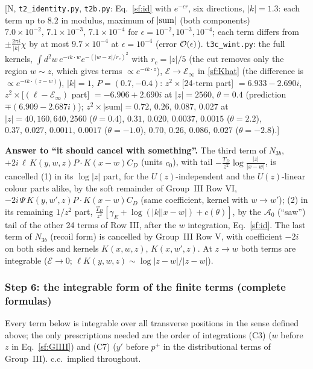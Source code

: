 \documentclass[10pt]{article}
\begin{document}
[N, \texttt{t2\_identity.py}, \texttt{t2b.py}: Eq.~\eqref{sf:id} with $e^{-\epsilon r}$, six directions, $|k|=1.3$: each term up to $8.2$ in modulus, maximum of $|{\rm sum}|$ (both components) $7.0\times10^{-2},\,7.1\times10^{-3},\,7.1\times10^{-4}$ for $\epsilon=10^{-2},10^{-3},10^{-4}$; each term differs from $\pm\frac{2\pi i}{|k|}\chi$ by at most $9.7\times10^{-4}$ at $\epsilon=10^{-4}$ (error ${\cal O}(\epsilon)$). \texttt{t3c\_wint.py}: the full kernels, $\int d^{2}w\,e^{-ik\cdot w}e^{-(|w-x|/r_{c})^{2}}$ with $r_{c}=|z|/5$ (the cut removes only the region $w\sim z$, which gives terms $\propto e^{-ik\cdot z}$), $\mathcal{E}\to\mathcal{E}_{\infty}$ in \eqref{sf:Khat} (the difference is $\propto e^{-ik\cdot(z-w)}$), $|k|=1$, $P=(0.7,-0.4)$: $z^{2}\times$[24-term part] $=6.933-2.690i$, $z^{2}\times$[$(\ell-\mathcal{E}_{\infty})$ part] $=-6.906+2.690i$ at $|z|=2560$, $\theta=0.4$ (prediction $\mp(6.909-2.687i)$); $z^{2}\times|$sum$|=0.72,\,0.26,\,0.087,\,0.027$ at $|z|=40,160,640,2560$ ($\theta=0.4$), $0.31,\,0.020,\,0.0037,\,0.0015$ ($\theta=2.2$), $0.37,\,0.027,\,0.0011,\,0.0017$ ($\theta=-1.0$), $0.70,\,0.26,\,0.086,\,0.027$ ($\theta=-2.8$).]

\noindent\textbf{Answer to ``it should cancel with something''.} The third term of $N_{3b}$, $+2i\,\ell\,K(y,w,z)P\!\cdot\!K(x-w)C_{D}$ (units $c_{0}$), with tail $-\frac{T_{D}}{z^{2}}\log\frac{|z|}{|x-w|}$, is cancelled (1) in its $\log|z|$ part, for the $U(z)$-independent and the $U(z)$-linear colour parts alike, by the soft remainder of Group~III Row VI, $-2i\,\Psi\,K(y,w',z)P\!\cdot\!K(x-w)C_{D}$ (same coefficient, kernel with $w\to w'$); (2) in its remaining $1/z^{2}$ part, $\frac{T_{D}}{z^{2}}[\gamma_{E}+\log(|k||x-w|)+c(\theta)]$, by the $\mathcal{A}_{0}$ (``saw'') tail of the other 24 terms of Row III, after the $w$ integration, Eq.~\eqref{sf:id}. The last term of $N_{3b}$ (recoil form) is cancelled by Group~III Row V, with coefficient $-2i$ on both sides and kernels $K(x,w,z)$, $K(x,w',z)$. At $z\to w$ both terms are integrable ($\mathcal{E}\to0$; $\ell K(y,w,z)\sim\log|z-w|/|z-w|$).

\subsubsection{Step 6: the integrable form of the finite terms (complete formulas)}
\noindent Every term below is integrable over all transverse positions in the sense defined above; the only prescriptions needed are the order of integrations (C3) ($w$ before $z$ in Eq.~\eqref{sf:GIIII}) and (C7) ($y'$ before $p^{+}$ in the distributional terms of Group~III). c.c.\ implied throughout.
\end{document}
